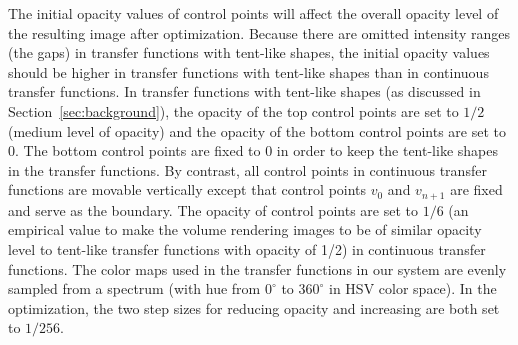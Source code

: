 The initial opacity values of control points will affect the overall opacity level of the resulting image after optimization. Because there are omitted intensity ranges (the gaps) in transfer functions with tent-like shapes, the initial opacity values should be higher in transfer functions with tent-like shapes than in continuous transfer functions.
In transfer functions with tent-like shapes (as discussed in Section~\ref{sec:background}), the opacity of the top control points are set to $ 1/2 $ (medium level of opacity) and the opacity of the bottom control points are set to 0. The bottom control points are fixed to 0 in order to keep the tent-like shapes in the transfer functions. By contrast, all control points in continuous transfer functions are movable vertically except that control points $ v_{0} $ and $ v_{n+1} $ are fixed and serve as the boundary. The opacity of control points are set to $ 1/6 $ (an empirical value to make the volume rendering images to be of similar opacity level to tent-like transfer functions with opacity of 1/2) in continuous transfer functions.
The color maps used in the transfer functions in our system are evenly sampled from a spectrum (with hue from $ 0^\circ $ to $ 360^\circ $ in HSV color space).
In the optimization, the two step sizes for reducing opacity and increasing are both set to $ 1/256 $.

